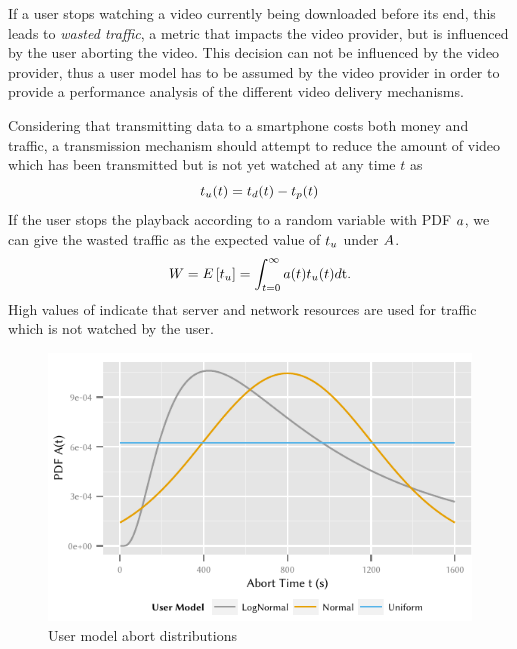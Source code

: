 If a user stops watching a video currently being downloaded before its end, this leads to \emph{wasted traffic}, a metric that impacts the video provider, but is influenced by the user aborting the video.
This decision can not be influenced by the video provider, thus a user model has to be assumed by the video provider in order to provide a performance analysis of the different video delivery mechanisms.

Considering that transmitting data to a smartphone costs both money and traffic, a transmission mechanism should attempt to reduce the amount of video which has been transmitted but is not yet watched at any time \(t\) as 
\[t_u(t) = t_d(t) - t_p(t)\]
If the user stops the playback according to a random variable \userabortrv with \gls{PDF} \(a\), we can give the wasted traffic \meanwastedtraffic as the expected value of $t_u$ under $A$.
\begin{equation}
W = E\left[t_u\right] = \int_{t=0}^{\infty} a(t) t_u(t) d\mathrm{t}.
\end{equation}
High values of \meanwastedtraffic indicate that server and network resources are used for traffic which is not watched by the user.

\begin{figure}
\begin{center}
  \includegraphics{application/lte_video/system_model/figures/abort_distributions}
  \caption{User model abort distributions}
  \label{fig:application:lte_video:system_model:model_assumptions:metrics:abort_distributions}
\end{center}
\end{figure}

